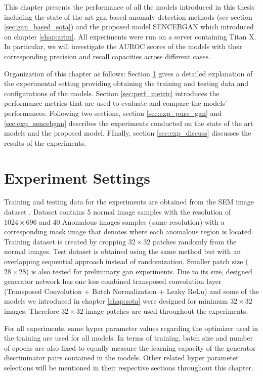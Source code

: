 
\begingroup

This chapter presents the performance of all the models introduced in this thesis including 
the state of the art gan based anomaly detection methods (see section \ref{sec:gan_based_sota}) and 
the proposed model SENCEBGAN which introduced on chapter \ref{chap:arim}. All experiments were run on 
a server containing Titan X. In particular, we will investigate the AUROC scores of the models with their 
corresponding precision and recall capacities across different cases. 

Organization of this chapter as follows: Section \ref{sec:exp_settings} gives a detailed explanation 
of the experimental setting providing obtaining the training and testing data and configurations of 
the models. Section \ref{sec:perf_metric} introduces the performance metrics that are used to evaluate 
and compare the models' performances. Following two sections, section \ref{sec:exp_pure_gan} and 
\ref{sec:exp_sencebgan} describes the experiments conducted on the state of the art models and the 
proposed model. FInally, section \ref{sec:exp_discuss} discusses the results of the experiments.


\section{Experiment Settings}
\label{sec:exp_settings}
Training and testing data for the experiments are obtained from the SEM image dataset \cite{sem}. 
Dataset contains 5 normal image samples with the resolution of $1024 \times 696$ and 40 Anomalous 
images samples (same resolution) with a corresponding mask image that denotes where each anomalous 
region is located. Training dataset is created by cropping $32 \times 32$ patches randomly from 
the normal images. Test dataset is obtained using the same method but with an overlapping sequential 
approach instead of randomization. Smaller patch size ($28 \times 28$) is also tested for preliminary 
gan experiments. Due to its size, designed generator network has one less combined transposed 
convolution layer (Transposed Convolution + Batch Normalization + Leaky ReLu) and some of the models 
we introduced in chapter \ref{chap:sota} were designed for minimum $32 \times 32$ images. Therefore 
$32 \times 32$ image patches are used throughout the experiments.
 
For all experiments, same hyper parameter values regarding the optimizer used in the training are used 
for all models. In terms of training, batch size and number of epochs are also fixed to equally 
measure the learning capacity of the generator discriminator pairs contained in the models. Other 
related hyper parameter selections will be mentioned in their respective sections throughout this chapter.

